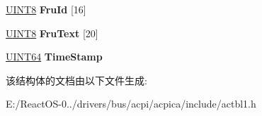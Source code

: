 \begin{DoxyCompactItemize}
\item 
\mbox{\label{structacpi__hest__generic__data__v300_a40ab6b9c551bf551d5ef51842538caed}} 
\hyperlink{_processor_bind_8h_ab27e9918b538ce9d8ca692479b375b6a}{U\+I\+N\+T8} {\bfseries Fru\+Id} \mbox{[}16\mbox{]}
\item 
\mbox{\label{structacpi__hest__generic__data__v300_a1f558fcd815d165e0843dbead4c5f544}} 
\hyperlink{_processor_bind_8h_ab27e9918b538ce9d8ca692479b375b6a}{U\+I\+N\+T8} {\bfseries Fru\+Text} \mbox{[}20\mbox{]}
\item 
\mbox{\label{structacpi__hest__generic__data__v300_ac72e58efe4de2bea3a440a8bac9a622f}} 
\hyperlink{_processor_bind_8h_a57be03562867144161c1bfee95ca8f7c}{U\+I\+N\+T64} {\bfseries Time\+Stamp}
\end{DoxyCompactItemize}


该结构体的文档由以下文件生成\+:\begin{DoxyCompactItemize}
\item 
E\+:/\+React\+O\+S-\/0../drivers/bus/acpi/acpica/include/actbl1.\+h\end{DoxyCompactItemize}
